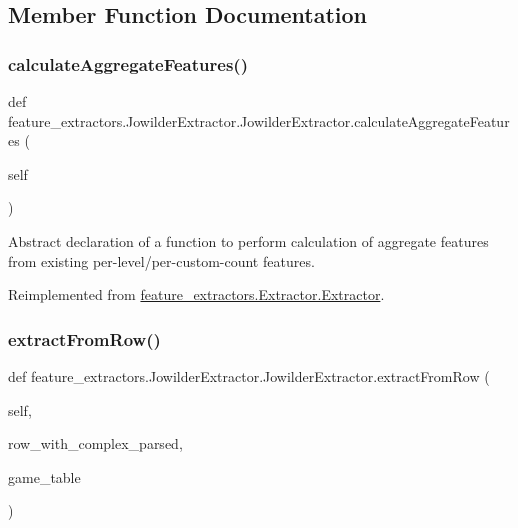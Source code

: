 \subsection{Member Function Documentation}
\mbox{\label{classfeature__extractors_1_1_jowilder_extractor_1_1_jowilder_extractor_aa8634d50ee53ef7244de9a53f45ba9e5}} 
\subsubsection{\texorpdfstring{calculateAggregateFeatures()}{calculateAggregateFeatures()}}
{\footnotesize\ttfamily def feature\+\_\+extractors.\+Jowilder\+Extractor.\+Jowilder\+Extractor.\+calculate\+Aggregate\+Features (\begin{DoxyParamCaption}\item[{}]{self }\end{DoxyParamCaption})}



Abstract declaration of a function to perform calculation of aggregate features from existing per-\/level/per-\/custom-\/count features. 



Reimplemented from \mbox{\hyperlink{classfeature__extractors_1_1_extractor_1_1_extractor_a7622c0b66dd98f59a8010c3511f4bdad}{feature\+\_\+extractors.\+Extractor.\+Extractor}}.

\mbox{\label{classfeature__extractors_1_1_jowilder_extractor_1_1_jowilder_extractor_a02ab1ac9f1234341dc74610d4a5606d0}} 
\subsubsection{\texorpdfstring{extractFromRow()}{extractFromRow()}}
{\footnotesize\ttfamily def feature\+\_\+extractors.\+Jowilder\+Extractor.\+Jowilder\+Extractor.\+extract\+From\+Row (\begin{DoxyParamCaption}\item[{}]{self,  }\item[{}]{row\+\_\+with\+\_\+complex\+\_\+parsed,  }\item[{\mbox{\hyperlink{class_game_table_1_1_game_table}{Game\+Table}}}]{game\+\_\+table }\end{DoxyParamCaption})}



